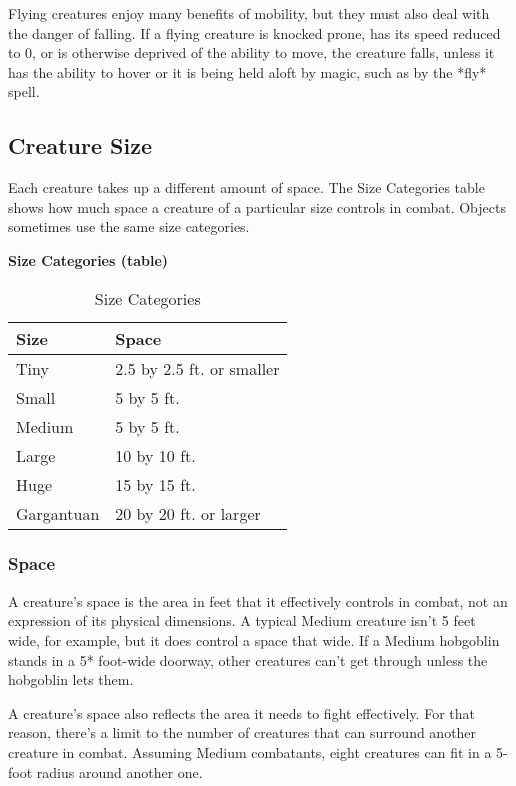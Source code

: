 Flying creatures enjoy many benefits of mobility, but they must also deal with the danger of falling. If a flying creature is knocked prone, has its speed reduced to 0, or is otherwise deprived of the ability to move, the creature falls, unless it has the ability to hover or it is being held aloft by magic, such as by the *fly* spell.

\subsection{Creature Size}

Each creature takes up a different amount of space. The Size Categories table shows how much space a creature of a particular size controls in combat. Objects sometimes use the same size categories.

\textbf{Size Categories (table)}

\begin{table}
    \centering
    \begin{tabular}{|l|l|}
        \hline
        Size & Space \\\hline
        Tiny & 2.5 by 2.5 ft. or smaller \\\hline
        Small & 5 by 5 ft. \\\hline
        Medium & 5 by 5 ft. \\\hline
        Large & 10 by 10 ft. \\\hline
        Huge & 15 by 15 ft. \\\hline
        Gargantuan & 20 by 20 ft. or larger \\\hline
    \end{tabular}
    \caption[Sizes]{Size Categories}
    \label{tbl:size-categories}
\end{table}

\subsubsection{Space}

A creature's space is the area in feet that it effectively controls in combat, not an expression of its physical dimensions. A typical Medium creature isn't 5 feet wide, for example, but it does control a space that wide. If a Medium hobgoblin stands in a 5* foot-wide doorway, other creatures can't get through unless the hobgoblin lets them.

A creature's space also reflects the area it needs to fight effectively. For that reason, there's a limit to the number of creatures that can surround another creature in combat. Assuming Medium combatants, eight creatures can fit in a 5-foot radius around another one.

